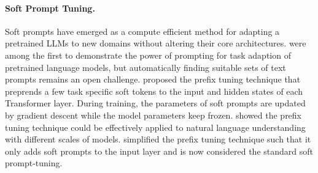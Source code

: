 \paragraph{Soft Prompt Tuning.}
Soft prompts have emerged as a compute efficient method for adapting a pretrained LLMs to new domains without altering their core architectures.
\citet{Brown2020Language} were among the first to demonstrate the power of prompting for task adaption of pretrained language models, but automatically finding suitable sets of
text prompts remains an open challenge.
\citet{Li2021Prefix, qin-eisner-2021-learning} proposed the prefix tuning technique that preprends a few task specific soft tokens to the input and hidden states of each Transformer layer. During training, the parameters of soft prompts are updated by gradient descent while the model parameters keep frozen.
\citet{Liu2021Ptuning} showed the prefix tuning technique could be effectively applied to
natural language understanding with different scales of models.
\citet{Lester2021Power} simplified the prefix tuning technique such that it only adds soft prompts to the input layer and is now considered the standard soft prompt-tuning.
